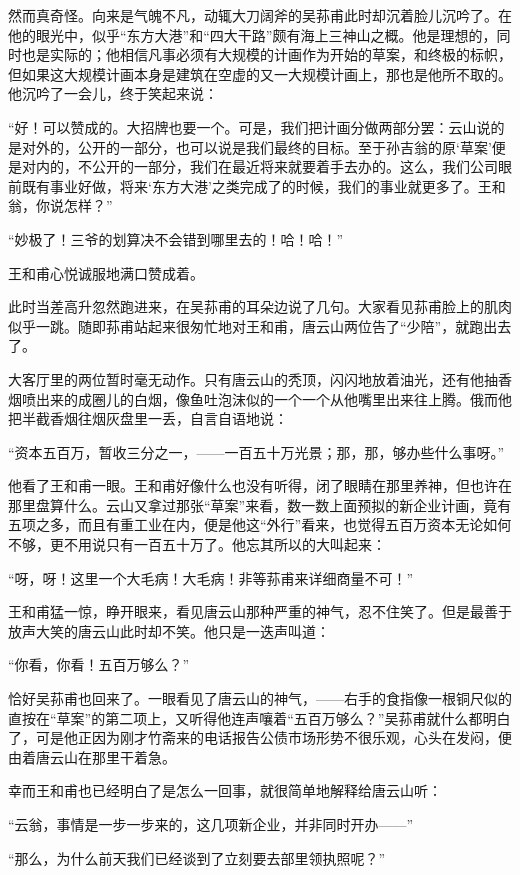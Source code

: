 \par 然而真奇怪。向来是气魄不凡，动辄大刀阔斧的吴荪甫此时却沉着脸儿沉吟了。在他的眼光中，似乎“东方大港”和“四大干路”颇有海上三神山之概。他是理想的，同时也是实际的；他相信凡事必须有大规模的计画作为开始的草案，和终极的标帜，但如果这大规模计画本身是建筑在空虚的又一大规模计画上，那也是他所不取的。他沉吟了一会儿，终于笑起来说：
\par “好！可以赞成的。大招牌也要一个。可是，我们把计画分做两部分罢：云山说的是对外的，公开的一部分，也可以说是我们最终的目标。至于孙吉翁的原‘草案’便是对内的，不公开的一部分，我们在最近将来就要着手去办的。这么，我们公司眼前既有事业好做，将来‘东方大港’之类完成了的时候，我们的事业就更多了。王和翁，你说怎样？”
\par “妙极了！三爷的划算决不会错到哪里去的！哈！哈！”
\par 王和甫心悦诚服地满口赞成着。
\par 此时当差高升忽然跑进来，在吴荪甫的耳朵边说了几句。大家看见荪甫脸上的肌肉似乎一跳。随即荪甫站起来很匆忙地对王和甫，唐云山两位告了“少陪”，就跑出去了。
\par 大客厅里的两位暂时毫无动作。只有唐云山的秃顶，闪闪地放着油光，还有他抽香烟喷出来的成圈儿的白烟，像鱼吐泡沫似的一个一个从他嘴里出来往上腾。俄而他把半截香烟往烟灰盘里一丢，自言自语地说：
\par “资本五百万，暂收三分之一，——一百五十万光景；那，那，够办些什么事呀。”
\par 他看了王和甫一眼。王和甫好像什么也没有听得，闭了眼睛在那里养神，但也许在那里盘算什么。云山又拿过那张“草案”来看，数一数上面预拟的新企业计画，竟有五项之多，而且有重工业在内，便是他这“外行”看来，也觉得五百万资本无论如何不够，更不用说只有一百五十万了。他忘其所以的大叫起来：
\par “呀，呀！这里一个大毛病！大毛病！非等荪甫来详细商量不可！”
\par 王和甫猛一惊，睁开眼来，看见唐云山那种严重的神气，忍不住笑了。但是最善于放声大笑的唐云山此时却不笑。他只是一迭声叫道：
\par “你看，你看！五百万够么？”
\par 恰好吴荪甫也回来了。一眼看见了唐云山的神气，——右手的食指像一根铜尺似的直按在“草案”的第二项上，又听得他连声嚷着“五百万够么？”吴荪甫就什么都明白了，可是他正因为刚才竹斋来的电话报告公债市场形势不很乐观，心头在发闷，便由着唐云山在那里干着急。
\par 幸而王和甫也已经明白了是怎么一回事，就很简单地解释给唐云山听：
\par “云翁，事情是一步一步来的，这几项新企业，并非同时开办——”
\par “那么，为什么前天我们已经谈到了立刻要去部里领执照呢？”
